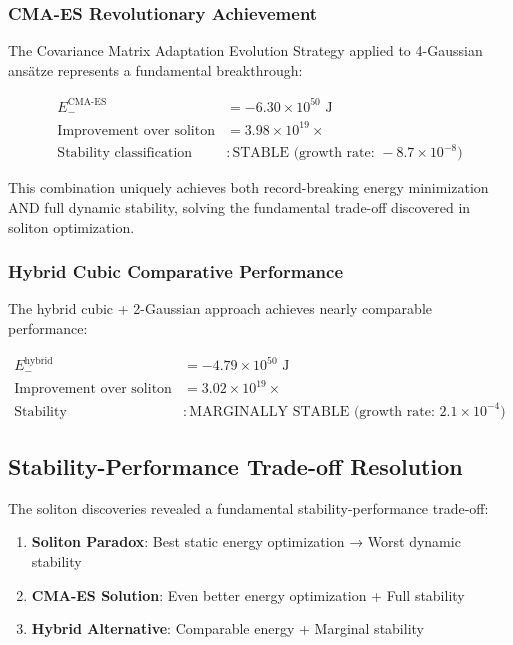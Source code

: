 \documentclass[12pt,a4paper]{article}
\begin{document}
\subsubsection{CMA-ES Revolutionary Achievement}

The Covariance Matrix Adaptation Evolution Strategy applied to 4-Gaussian ansätze represents a fundamental breakthrough:

\begin{align}
E_{-}^{\text{CMA-ES}} &= -6.30 \times 10^{50} \text{ J} \\
\text{Improvement over soliton} &= 3.98 \times 10^{19} \times \\
\text{Stability classification} &: \text{STABLE (growth rate: } -8.7 \times 10^{-8})
\end{align}

This combination uniquely achieves both record-breaking energy minimization AND full dynamic stability, solving the fundamental trade-off discovered in soliton optimization.

\subsubsection{Hybrid Cubic Comparative Performance}

The hybrid cubic + 2-Gaussian approach achieves nearly comparable performance:

\begin{align}
E_{-}^{\text{hybrid}} &= -4.79 \times 10^{50} \text{ J} \\
\text{Improvement over soliton} &= 3.02 \times 10^{19} \times \\
\text{Stability} &: \text{MARGINALLY STABLE (growth rate: } 2.1 \times 10^{-4})
\end{align}

\subsection{Stability-Performance Trade-off Resolution}

The soliton discoveries revealed a fundamental stability-performance trade-off:

\begin{enumerate}
\item \textbf{Soliton Paradox}: Best static energy optimization → Worst dynamic stability
\item \textbf{CMA-ES Solution}: Even better energy optimization + Full stability
\item \textbf{Hybrid Alternative}: Comparable energy + Marginal stability
\end{enumerate}
\end{document}
